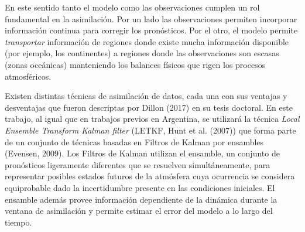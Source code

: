 \documentclass[12pt,oneside,a4paper]{reedthesis}
\begin{document}
En este sentido tanto el modelo como las observaciones cumplen un rol fundamental en la asimilación. Por un lado las observaciones permiten incorporar información continua para corregir los pronósticos. Por el otro, el modelo permite \emph{transportar} información de regiones donde existe mucha información disponible (por ejemplo, los continentes) a regiones donde las observaciones son escasas (zonas oceánicas) manteniendo los balances físicos que rigen los procesos atmosféricos.

Existen distintas técnicas de asimilación de datos, cada una con sus ventajas y desventajas que fueron descriptas por Dillon (2017) en su tesis doctoral. En este trabajo, al igual que en trabajos previos en Argentina, se utilizará la técnica \emph{Local Ensemble Transform Kalman filter} (LETKF, Hunt et al. (2007)) que forma parte de un conjunto de técnicas basadas en Filtros de Kalman por ensambles (Evensen, 2009). Los Filtros de Kalman utilizan el ensamble, un conjunto de pronósticos ligeramente diferentes que se resuelven simultáneamente, para representar posibles estados futuros de la atmósfera cuya ocurrencia se considera equiprobable dado la incertidumbre presente en las condiciones iniciales. El ensamble además provee información dependiente de la dinámica durante la ventana de asimilación y permite estimar el error del modelo a lo largo del tiempo.
\end{document}
